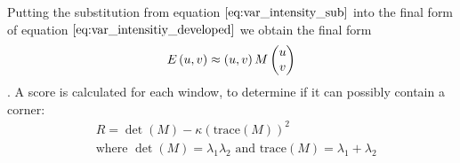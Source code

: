 Putting the substitution from equation $\ref{eq:var_intensity_sub}$ into the final form of equation $\ref{eq:var_intensitiy_developed}$ we obtain the final form
\begin{equation}
	E \left( u, v \right) \approx \left( u,v \right) M \colvec{u}{v}
\end{equation}.
A score is calculated for each window, to determine if it can possibly contain a corner:
\begin{equation}
\begin{aligned}
& R = \det(M) - \kappa \left(\text{trace}(M)\right)^2 \\
&\text{where } \det(M) = \lambda_1 \lambda_2 \text{ and } \text{trace}(M) = \lambda_1 + \lambda_2
\end{aligned}
\label{eq:harris_response}
\end{equation}





